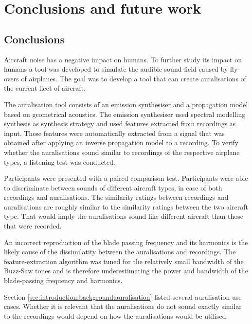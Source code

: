 \chapter{Conclusions and future work}\label{chapter:conclusions}

\section{Conclusions}


Aircraft noise has a negative impact on humans. To further study its impact on
humans a tool was developed to simulate the audible sound field caused by
fly-overs of airplanes. The goal was to develop a tool that can create
auralisations of the current fleet of aircraft.

The auralisation tool consists of an emission synthesiser and a propagation
model based on geometrical acoustics. The emission synthesiser used spectral
modelling synthesis as synthesis strategy and used features extracted from
recordings as input. These features were automatically extracted from a signal
that was obtained after applying an inverse propagation model to a recording.
To verify whether the auralisations sound similar to recordings of the
respective airplane types, a listening test was conducted.

Participants were presented with a paired comparison test. Participants were
able to discriminate between sounds of different aircraft types, in case of both
recordings and auralisations. The similarity ratings between recordings and
auralisations are roughly similar to the similarity ratings between the two
aircraft type. That would imply the auralisations sound like different aircraft
than those that were recorded.

An incorrect reproduction of the blade passing frequency and its harmonics is
the likely cause of the dissimilatity between the auralisations and recordings.
The feature-extraction algorithm was tuned for the relatively small bandwidth of
the Buzz-Saw tones and is therefore underestimating the power and bandwidth of
the blade-passing frequency and harmonics.

Section \ref{sec:introduction:background:auralisation} listed several
auralisation use cases. Whether it is relevant that the auralisations do not
sound exactly similar to the recordings would depend on how the auralisations
would be utilised.

